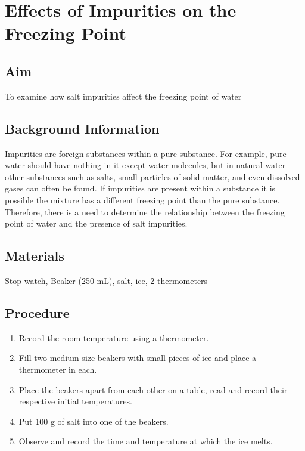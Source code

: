 \chapter{Effects of Impurities on the Freezing Point}

\section{Aim}
To examine how salt impurities affect the freezing point of water

\section{Background Information}
Impurities are foreign substances within a pure substance. For example, pure water should have nothing in it except water molecules, but in natural water other substances such as salts, small particles of solid matter, and even dissolved gases can often be found. If impurities are present within a substance it is possible the mixture has a different freezing point than the pure substance. Therefore, there is a need to determine the relationship between the freezing point of water and the presence of salt impurities.

\section{Materials}
Stop watch, Beaker (250 mL), salt, ice, 2 thermometers

\section{Procedure}
\begin{enumerate}
\item Record the room temperature using a thermometer.
\item Fill two medium size beakers with small pieces of ice and place a thermometer in each. 
\item Place the beakers apart from each other on a table, read and record their respective initial temperatures.
\item Put 100 g of salt into one of the beakers.
\item Observe and record the time and temperature at which the ice melts.
\end{enumerate}


